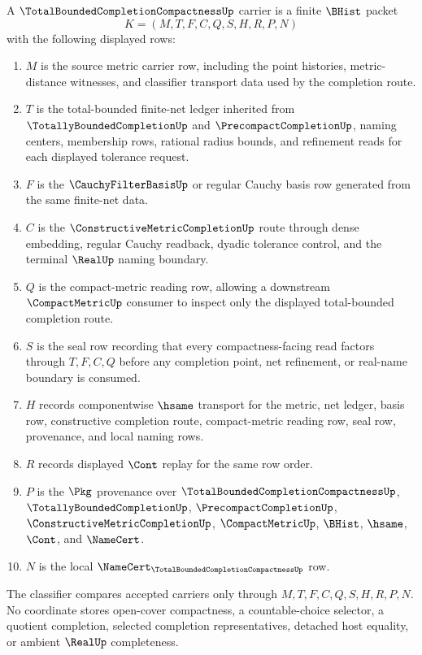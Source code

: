 \begin{definition}
\label{def:total-bounded-completion-compactness-carrier}
A $\TotalBoundedCompletionCompactnessUp$ carrier is a finite $\BHist$ packet
$$
K=(M,T,F,C,Q,S,H,R,P,N)
$$
with the following displayed rows:
\begin{enumerate}
\item $M$ is the source metric carrier row, including the point histories, metric-distance witnesses, and classifier transport data used by the completion route.
\item $T$ is the total-bounded finite-net ledger inherited from $\TotallyBoundedCompletionUp$ and $\PrecompactCompletionUp$, naming centers, membership rows, rational radius bounds, and refinement reads for each displayed tolerance request.
\item $F$ is the $\CauchyFilterBasisUp$ or regular Cauchy basis row generated from the same finite-net data.
\item $C$ is the $\ConstructiveMetricCompletionUp$ route through dense embedding, regular Cauchy readback, dyadic tolerance control, and the terminal $\RealUp$ naming boundary.
\item $Q$ is the compact-metric reading row, allowing a downstream $\CompactMetricUp$ consumer to inspect only the displayed total-bounded completion route.
\item $S$ is the seal row recording that every compactness-facing read factors through $T,F,C,Q$ before any completion point, net refinement, or real-name boundary is consumed.
\item $H$ records componentwise $\hsame$ transport for the metric, net ledger, basis row, constructive completion route, compact-metric reading row, seal row, provenance, and local naming rows.
\item $R$ records displayed $\Cont$ replay for the same row order.
\item $P$ is the $\Pkg$ provenance over $\TotalBoundedCompletionCompactnessUp$, $\TotallyBoundedCompletionUp$, $\PrecompactCompletionUp$, $\ConstructiveMetricCompletionUp$, $\CompactMetricUp$, $\BHist$, $\hsame$, $\Cont$, and $\NameCert$.
\item $N$ is the local $\NameCert_{\TotalBoundedCompletionCompactnessUp}$ row.
\end{enumerate}
The classifier compares accepted carriers only through $M,T,F,C,Q,S,H,R,P,N$. No coordinate stores open-cover compactness, a countable-choice selector, a quotient completion, selected completion representatives, detached host equality, or ambient $\RealUp$ completeness.
\end{definition}

